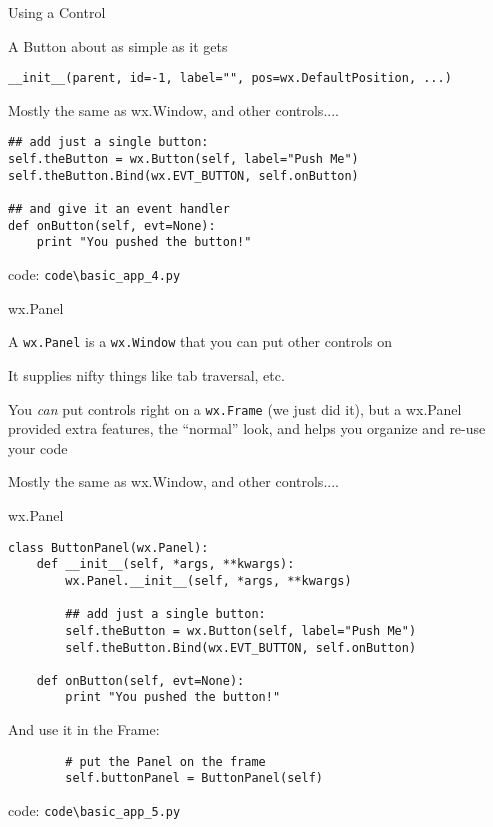\documentclass{beamer}
\begin{document}
\begin{frame}[fragile]{Using a Control}

{\Large A Button about as simple as it gets}

\vfill
{\verb`__init__(parent, id=-1, label="", pos=wx.DefaultPosition, ...)` }

\vfill
{\Large Mostly the same as wx.Window, and other controls....}

\begin{verbatim}
## add just a single button:
self.theButton = wx.Button(self, label="Push Me")
self.theButton.Bind(wx.EVT_BUTTON, self.onButton)
 
## and give it an event handler                                  
def onButton(self, evt=None):
    print "You pushed the button!"
\end{verbatim}

\vfill
code: \verb`code\basic_app_4.py`
\end{frame}

\begin{frame}[fragile]{wx.Panel}

{\Large A \verb`wx.Panel` is a \verb`wx.Window` that you can put other controls on}

\vfill
{\Large It supplies nifty things like tab traversal, etc.}

\vfill
{\Large You \emph{can} put controls right on a \verb`wx.Frame` (we just did it), but a wx.Panel provided extra features, the ``normal'' look, and helps you organize and re-use your code}

\vfill
{\Large Mostly the same as wx.Window, and other controls....}

\end{frame}

\begin{frame}[fragile]{wx.Panel}

\begin{verbatim}
class ButtonPanel(wx.Panel):
    def __init__(self, *args, **kwargs):
        wx.Panel.__init__(self, *args, **kwargs)

        ## add just a single button:
        self.theButton = wx.Button(self, label="Push Me")
        self.theButton.Bind(wx.EVT_BUTTON, self.onButton)
                                   
    def onButton(self, evt=None):
        print "You pushed the button!"
\end{verbatim}
And use it in the Frame:
\begin{verbatim}
        # put the Panel on the frame
        self.buttonPanel = ButtonPanel(self)
\end{verbatim}

\vfill
code: \verb`code\basic_app_5.py`
\end{frame}
\end{document}
